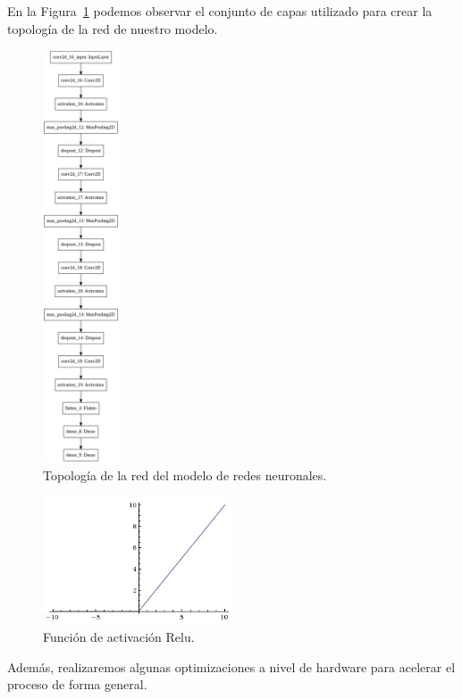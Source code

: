 En la Figura~\ref{fig:Topología de la red del modelo de redes neuronales.} podemos observar el conjunto de capas utilizado para crear la topología de la red de nuestro modelo.
\begin{figure}
    \centering
    \includegraphics[width=0.2\textwidth]{images/chapter2/model.png}
    \caption{Topología de la red del modelo de redes neuronales.}
    \label{fig:Topología de la red del modelo de redes neuronales.}
\end{figure}

\begin{figure}
    \centering
    \includegraphics[width=0.5\textwidth]{images/chapter2/relu.jpg}
    \caption{Función de activación Relu.}
    \label{fig:Función de activación Relu}
\end{figure}
Además, realizaremos algunas optimizaciones a nivel de hardware para acelerar el proceso de forma general.

